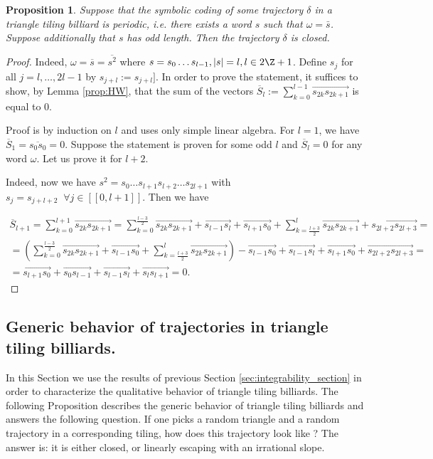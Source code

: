 \documentclass[12pt]{article}
\newtheorem{proposition}{Proposition}
\theoremstyle{definition}
\begin{document}
\begin{proposition}
Suppose that the symbolic coding of some trajectory $\delta$ in a triangle tiling billiard is periodic, i.e. there exists a word $s$ such that $\omega=\bar{s}$. Suppose additionally that $s$ has odd length. Then the trajectory $\delta$ is closed. 
\end{proposition}
\begin{proof}
Indeed, $\omega=\overline{s}=\overline{s^2}$ where $s=s_0 \ldots s_{l-1}, |s|=l, l\in 2\Z+1$. Define $s_j$ for all $j=l, \ldots, 2l-1$ by $s_{j+l}:=s_{j+l}]$. In order to prove the statement, it suffices to show, by Lemma \ref{prop:HW}, that the sum of the vectors $\overline{S}_{l}:=\sum_{k=0}^{l-1} \overrightarrow{s_{2k} s_{2k+1}}$ is equal to $0$. 

Proof is by induction on $l$ and uses only simple linear algebra. For $l=1$, we have $\overline{S}_{1}=\overline{s_0 s_0}=0$. Suppose the statement is proven for some odd $l$ and $\overline{S}_{l}=0$ for any word $\omega$. Let us prove it for $l+2$. 

Indeed, now we have $s^2=s_0 \ldots s_{l+1} s_{l+2} \ldots s_{2l+1}$ with $s_j=s_{j+l+2} \; \; \forall j \in [[0, l+1]]$. Then we have

\begin{multline*}
\overline{S}_{l+1}=\sum_{k=0}^{l+1} \overrightarrow{s_{2k} s_{2k+1}}=\sum_{k=0}^{\frac{l-3}{2}} \overrightarrow{s_{2k} s_{2k+1}} + \overrightarrow{s_{l-1} s_l}+\overrightarrow{s_{l+1} s_{0}}+ \sum_{k=\frac{l+3}{2}}^{l} \overrightarrow{s_{2k} s_{2k+1}} + \overrightarrow{s_{2l+2} s_{2l+3}} =\\
=  \left(\sum_{k=0}^{\frac{l-3}{2}} \overrightarrow{s_{2k} s_{2k+1}} + \overrightarrow{s_{l-1} s_0} +
\sum_{k=\frac{l+3}{2}}^{l} \overrightarrow{s_{2k} s_{2k+1}}
\right)-\overrightarrow{s_{l-1} s_0} + \overrightarrow{s_{l-1} s_l}+\overrightarrow{s_{l+1} s_{0}} + \overrightarrow{s_{2l+2} s_{2l+3}}=\\
= \overrightarrow{s_{l+1} s_{0}}+ \overrightarrow{s_0 s_{l-1}}+\overrightarrow{s_{l-1} s_l}+ \overrightarrow{s_{l} s_{l+1}}=0.
\end{multline*}
\end{proof}


\subsection{Generic behavior of trajectories in triangle tiling billiards.}
In this Section we use the results of previous Section \ref{sec:integrability_section} in order to characterize the qualitative behavior of triangle tiling billiards. The following Proposition describes the generic behavior of triangle tiling billiards and answers the following question. If one picks a random triangle and a random trajectory in a corresponding tiling, how does this trajectory look like ? The answer is: it is either closed, or linearly escaping with an irrational slope.
\end{document}
